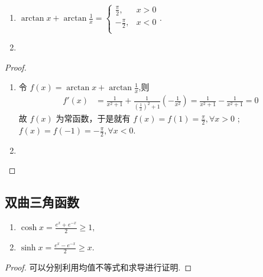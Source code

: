 \documentclass[../../main.tex]{subfiles}
\begin{document}
\begin{proposition}\label{proposition:arctan相关等式}
\begin{enumerate}[(1)]
\item $\arctan x+\arctan \frac{1}{x}=\begin{cases}
\frac{\pi}{2},&x>0\\
-\frac{\pi}{2},&x<0\\
\end{cases}$.

\item 
\end{enumerate}
\end{proposition}
\begin{proof}
\begin{enumerate}
\item 令 \( f(x)=\arctan x+\arctan\frac{1}{x} \),则
\begin{align*}
f'(x)&=\frac{1}{x^2 + 1}+\frac{1}{(\frac{1}{x})^2 + 1}(-\frac{1}{x^2})=\frac{1}{x^2 + 1}-\frac{1}{x^2 + 1}=0
\end{align*}
故 \( f(x) \) 为常函数，于是就有 \( f(x)=f(1)=\frac{\pi}{2},\forall x>0 \) ;\( f(x)=f(-1)=-\frac{\pi}{2},\forall x<0 \).

\item 
\end{enumerate}
\end{proof}


\subsection{双曲三角函数}

\begin{proposition}
\begin{enumerate}[(1)]
\item $\cosh x=\frac{e^{x}+e^{-x}}{2}\geqslant1,$

\item $\sinh x=\frac{e^{x}-e^{-x}}{2}\geqslant x.$
\end{enumerate}
\end{proposition}
\begin{proof}
可以分别利用均值不等式和求导进行证明. 
\end{proof}
\end{document}
